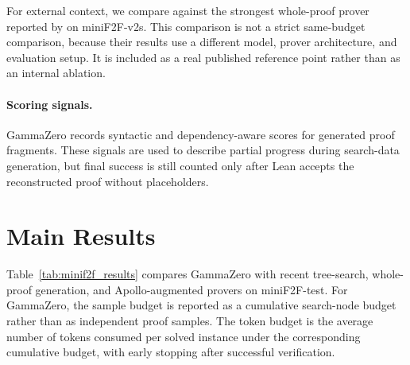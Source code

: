 For external context, we compare against the strongest whole-proof prover reported by
\citet{ospanov2025minif2fLeanRevisited} on miniF2F-v2s. This comparison is not a strict
same-budget comparison, because their results use a different model, prover architecture, and
evaluation setup. It is
included as a real published reference point rather than as an internal ablation.

\paragraph{Scoring signals.}
GammaZero records syntactic and dependency-aware scores for generated proof fragments. These signals are used to describe partial progress during search-data generation, but final success is still counted only after Lean accepts the reconstructed proof without placeholders.

\section{Main Results}

Table~\ref{tab:minif2f_results} compares GammaZero with recent tree-search, whole-proof
generation, and Apollo-augmented provers on miniF2F-test. For GammaZero, the sample budget is
reported as a cumulative search-node budget rather than as independent proof samples. The token
budget is the average number of tokens consumed per solved instance under the corresponding
cumulative budget, with early stopping after successful verification.

